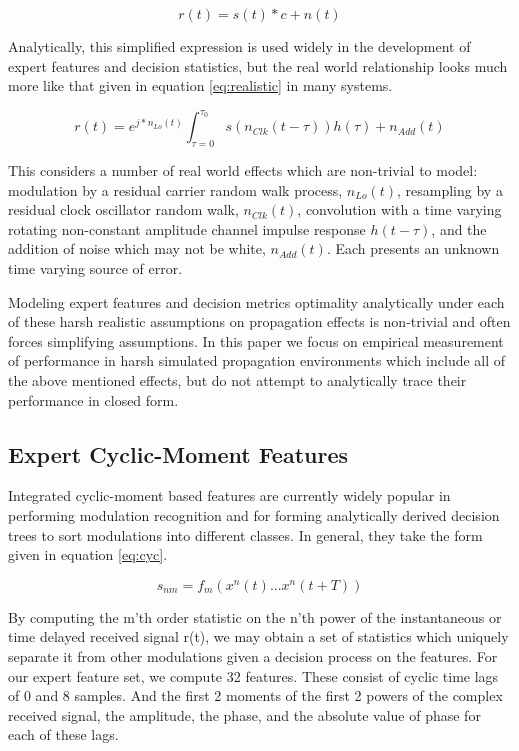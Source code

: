 \documentclass[runningheads,a4paper]{llncs}
\begin{document}
\begin{equation} \label{eq:classic}
r(t) = s(t)*c + n(t)
\end{equation}

Analytically, this simplified expression is used widely in the development of expert features and decision statistics, but the real world relationship looks much more like that given in equation \ref{eq:realistic} in many systems.

\begin{equation} \label{eq:realistic}
r(t) = e^{j*n_{Lo}(t)} \int_{\tau=0}^{\tau_0} s(n_{Clk}(t-\tau))h(\tau) + n_{Add}(t) 
\end{equation}

This considers a number of real world effects which are non-trivial to model: modulation by a residual carrier random walk process, $n_{Lo}(t)$, resampling by a residual clock oscillator random walk, $n_{Clk}(t)$, convolution with a time varying rotating non-constant amplitude channel impulse response $h(t-\tau)$, and the addition of noise which may not be white, $n_{Add}(t)$.   Each presents an unknown time varying source of error.

Modeling expert features and decision metrics optimality analytically under each of these harsh realistic assumptions on propagation effects is non-trivial and often forces simplifying assumptions.  In this paper we focus on empirical measurement of performance in harsh simulated propagation environments which include all of the above mentioned effects, but do not attempt to analytically trace their performance in closed form.

\subsection{Expert Cyclic-Moment Features}

Integrated cyclic-moment based features \cite{cumulant} are currently widely popular in performing modulation recognition and for forming analytically derived decision trees to sort modulations into different classes.   In general, they take the form given in equation \ref{eq:cyc}.

\begin{equation} \label{eq:cyc}
s_{nm} = f_m( x^n(t) ... x^n(t+T) )
\end{equation}

By computing the m'th order statistic on the n'th power of the instantaneous or time delayed received signal r(t), we may obtain a set of statistics which uniquely separate it from other modulations given a decision process on the features.  For our expert feature set, we compute 32 features.  These consist of cyclic time lags of 0 and 8 samples.  And the first 2 moments of the first 2 powers of the complex received signal, the amplitude, the phase, and the absolute value of phase for each of these lags.
\end{document}
